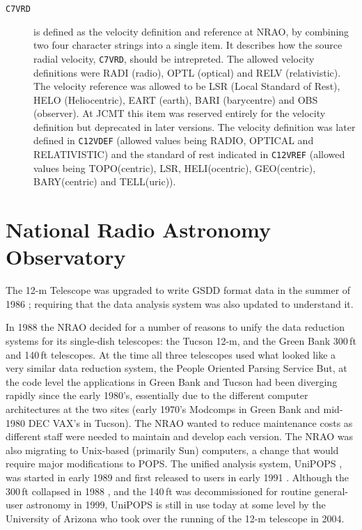 \documentclass[final,authoryear,5p,times,twocolumn]{elsarticle}
\newcommand{\ascl}[1]{\href{http://www.ascl.net/#1}{ascl:#1}}
\begin{document}
\begin{description}
\item[\texttt{C7VRD}] is defined as the velocity definition and
  reference at NRAO, by combining two four character strings into a
  single item. It describes how the source radial velocity,
  \texttt{C7VRD}, should be intrepreted. The allowed velocity
  definitions were RADI (radio), OPTL (optical) and RELV
  (relativistic). The velocity reference was allowed to be LSR (Local
  Standard of Rest), HELO (Heliocentric), EART (earth), BARI
  (barycentre) and OBS (observer). At JCMT this item was reserved
  entirely for the velocity definition but deprecated in later
  versions. The velocity definition was later defined in
  \texttt{C12VDEF} (allowed values being RADIO, OPTICAL and
  RELATIVISTIC) and the standard of rest indicated in \texttt{C12VREF}
  (allowed values being TOPO(centric), LSR, HELI(ocentric),
  GEO(centric), BARY(centric) and TELL(uric)).

\end{description}


\section{National Radio Astronomy Observatory}


The 12-m Telescope was upgraded to write GSDD format data in the
summer of 1986 \citep{tcus23,1987NRAO30}; requiring that the data
analysis system was also updated to understand it.

In 1988 the NRAO decided for a number of reasons to unify the data
reduction systems for its single-dish telescopes: the Tucson 12-m, and
the Green Bank 300\,ft and 140\,ft telescopes.  At the time all three
telescopes used what looked like a very similar data reduction system,
the People Oriented Parsing Service \citep[POPS;][]{1982POPS}
But, at the code level the applications in Green Bank
and Tucson had been diverging rapidly since the early 1980's,
essentially due to the different computer architectures at the two
sites (early 1970's Modcomps in Green Bank and mid-1980 DEC VAX's in
Tucson).  The NRAO wanted to reduce maintenance costs as different
staff were needed to maintain and develop each version.  The NRAO was
also migrating to Unix-based (primarily Sun) computers, a change that
would require major modifications to POPS. The unified analysis system, UniPOPS
\citep[][\ascl{1503.007}]{UNIPOPS}, was started in early 1989 and first released to users in early
1991 \citep{1991BAAS...23..535V}.  Although the 300\,ft collapsed in
1988 \citep{1990BAAS...22..487V}, and the 140\,ft was
decommissioned for routine general-user astronomy in 1999, UniPOPS
is still in use today at
some level by the University of Arizona who took over the running of
the 12-m telescope in 2004.
\end{document}
